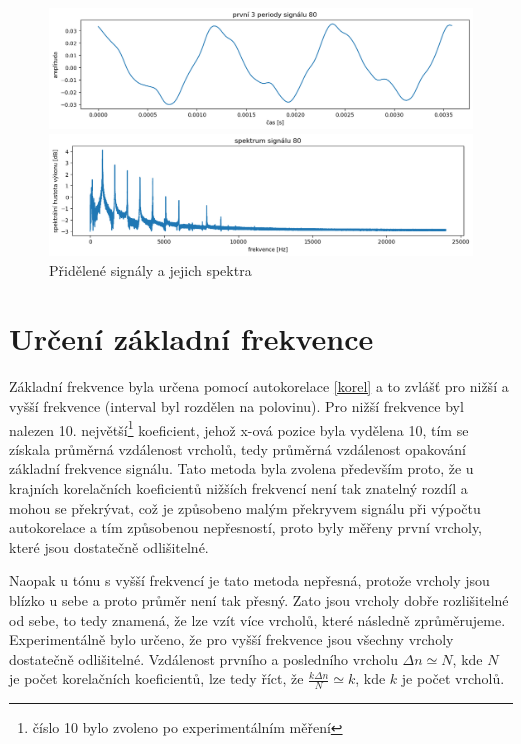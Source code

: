\documentclass[a4paper, 12pt]{article}
\begin{document}
\begin{figure}[H]
		\begin{minipage}{.5\textwidth}
			\includegraphics[width=\textwidth]{src/sign_c.png}
		\end{minipage}
		\begin{minipage}{.5\textwidth}
			\includegraphics[width=\textwidth]{src/spectr_c.png}
		\end{minipage}
		\caption{Přidělené signály a jejich spektra}
		\label{fig:signaly}
	\end{figure}

	\pagebreak
	\section{Určení základní frekvence}
	Základní frekvence byla určena pomocí autokorelace \eqref{korel} a to zvlášť pro nižší a vyšší frekvence (interval byl rozdělen na polovinu). Pro nižší frekvence byl nalezen 10. největší\footnote{číslo 10 bylo zvoleno po experimentálním měření} koeficient, jehož x-ová pozice byla vydělena 10, tím se získala průměrná vzdálenost vrcholů, tedy průměrná vzdálenost opakování základní frekvence signálu. Tato metoda byla zvolena především proto, že u krajních korelačních koeficientů nižších frekvencí není tak znatelný rozdíl a mohou se překrývat, což je způsobeno malým překryvem signálu při výpočtu autokorelace a tím způsobenou nepřesností, proto byly měřeny první vrcholy, které jsou dostatečně odlišitelné.
	
	Naopak u tónu s vyšší frekvencí je tato metoda nepřesná, protože vrcholy jsou blízko u sebe a proto průměr není tak přesný. Zato jsou vrcholy dobře rozlišitelné od sebe, to tedy znamená, že lze vzít více vrcholů, které následně zprůměrujeme. Experimentálně bylo určeno, že pro vyšší frekvence jsou všechny vrcholy dostatečně odlišitelné. Vzdálenost prvního a posledního vrcholu $\Delta n \simeq N$, kde $N$ je počet korelačních koeficientů, lze tedy říct, že $\frac{k\Delta n}{N} \simeq k$, kde $k$ je počet vrcholů.
	
\end{document}
